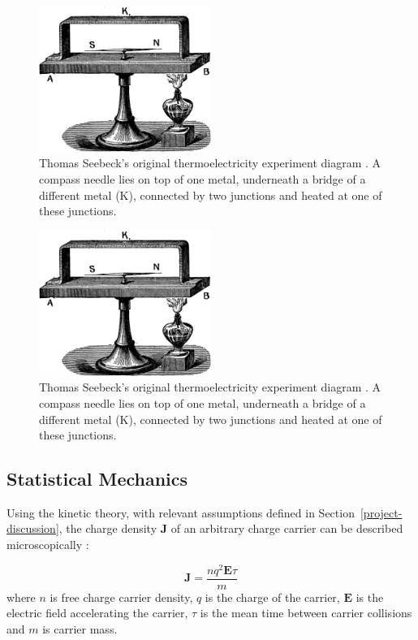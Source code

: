 \documentclass[12pt,titlepage,draft]{article}
\newcommand{\secref}[2][Section~]{#1\ref{#2}}
\renewcommand{\vec}[1]{\mathbf{#1}}
\begin{document}
\begin{figure}
	\centering
	\includegraphics[width=0.5\textwidth]{seebeck-experiment-black.png}
	\caption{Thomas Seebeck's original thermoelectricity experiment
	diagram \cite{seebeck-original}. A compass needle lies on top of
	one metal, underneath a bridge of a different metal (K), connected
	by two junctions and heated at one of these junctions.}
	\label{seebeck-experiment}
\end{figure}

\begin{figure}
	\centering
	\includegraphics[width=0.5\textwidth]{seebeck-experiment-black.png}
	\caption{Thomas Seebeck's original thermoelectricity experiment
	diagram \cite{seebeck-original}. A compass needle lies on top of
	one metal, underneath a bridge of a different metal (K), connected
	by two junctions and heated at one of these junctions.}
	\label{seebeck-experiment}
\end{figure}

\subsection{Statistical Mechanics}
Using the kinetic theory, with relevant assumptions defined in \secref{project-discussion}, the charge density
$\vec{J}$ of an arbitrary charge carrier can be described
microscopically \cite{kittel}:

\begin{equation}
\label{charge-density}
	\vec{J} = \frac{nq^2\vec{E} \tau}{m}
\end{equation}
where $n$ is free charge carrier density, $q$ is the charge of the
carrier, $\vec{E}$ is the electric field accelerating the
carrier, $\tau$ is the mean time between carrier collisions and $m$ is
carrier mass.
\end{document}
